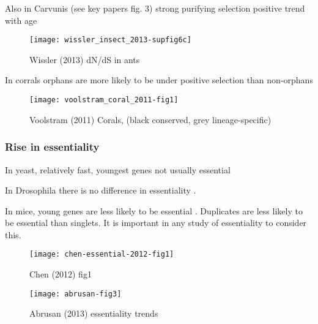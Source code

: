         Also in Carvunis (see key papers fig. 3) strong purifying selection
        positive trend with age \cite{carvunis_proto-genes_2012}

        \begin{figure}[!hbpt] \centering
            \texttt{[image: wissler\_insect\_2013-supfig6c]}
            \caption{ Wissler (2013) dN/dS in ants
                \cite{wissler_mechanisms_2013} } \end{figure}

        In corrals orphans are more likely to be under positive selection
        than non-orphans \cite{voolstra_rapid_2011}

        \begin{figure}[!hbpt] \centering
            \texttt{[image: voolstram\_coral\_2011-fig1]}
            \caption{ Voolstram (2011) Corals, (black conserved, grey
                lineage-specific) \cite{voolstra_rapid_2011} } \end{figure}



        \FloatBarrier

    \subsubsection{Rise in essentiality}

        In yeast, relatively fast, youngest genes not usually essential
        \cite{abrusan_integration_2013}

        In Drosophila there is no difference in essentiality
        \cite{chen_new_2010}. 

        In mice, young genes are less likely to be essential
        \cite{chen_younger_2012}. Duplicates are less likely to be essential
        than singlets. It is important in any study of essentiality to consider
        this.

        \begin{figure}[!hbpt]
            \centering
            \texttt{[image: chen-essential-2012-fig1]}
            \caption{Chen (2012) fig1 \cite{chen_younger_2012}}
        \end{figure}

        \begin{figure}[!hbpt] \centering
            \texttt{[image: abrusan-fig3]}
            \caption{Abrusan (2013) essentiality trends}
        \end{figure}
        \FloatBarrier


